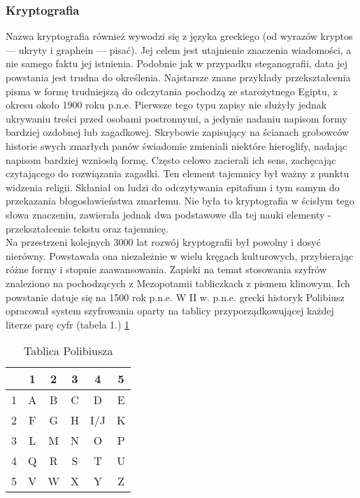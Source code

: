 \documentclass[a4paper]{article}
\begin{document}
\subsubsection{Kryptografia}
Nazwa kryptografia również wywodzi się z języka greckiego (od wyrazów kryptos — ukryty i graphein — pisać). Jej celem jest utajnienie znaczenia wiadomości, a nie samego faktu jej istnienia.
Podobnie jak w przypadku steganografii, data jej powstania jest trudna do określenia. Najstarsze
znane przykłady przekształcenia pisma w formę trudniejszą do odczytania pochodzą ze starożytnego Egiptu, z okresu około 1900 roku p.n.e. Pierwsze tego typu zapisy nie służyły jednak ukrywaniu
treści przed osobami postronnymi, a jedynie nadaniu napisom formy bardziej ozdobnej lub zagadkowej. Skrybowie zapisujący na ścianach grobowców historie swych zmarłych panów świadomie
zmieniali niektóre hieroglify, nadając napisom bardziej wzniosłą formę. Często celowo zacierali ich
sens, zachęcając czytającego do rozwiązania zagadki. Ten element tajemnicy był ważny z punktu
widzenia religii. Skłaniał on ludzi do odczytywania epitafium i tym samym do przekazania błogosławieństwa zmarłemu. Nie była to kryptografia w ścisłym tego słowa znaczeniu, zawierała jednak
dwa podstawowe dla tej nauki elementy - przekształcenie tekstu oraz tajemnicę.\\
Na przestrzeni kolejnych 3000 lat rozwój kryptografii był powolny i dosyć nierówny. Powstawała
ona niezależnie w wielu kręgach kulturowych, przybierając różne formy i stopnie zaawansowania.
Zapiski na temat stosowania szyfrów znaleziono na pochodzących z Mezopotamii tabliczkach z
pismem klinowym. Ich powstanie datuje się na 1500 rok p.n.e. W II w. p.n.e. grecki historyk Polibiusz opracował system szyfrowania oparty na tablicy przyporządkowującej każdej literze parę
cyfr (tabela 1.)
\ref{tabela 1}
\begin{table}[h]
\centering\caption{Tablica Polibiusza}\label{tabela 1}
\begin{tabular}{|c|c|c|c|c|c|}
\hline
  & 1 & 2 & 3 & 4 & 5\\
\hline
1 & A & B & C & D & E\\
\hline
2 & F & G & H & I/J & K\\
\hline
3 & L & M & N & O & P\\
\hline
4 & Q & R & S & T & U\\
\hline
5 & V & W & X & Y & Z\\
\hline
\end{tabular}
\end{table}
\end{document}
